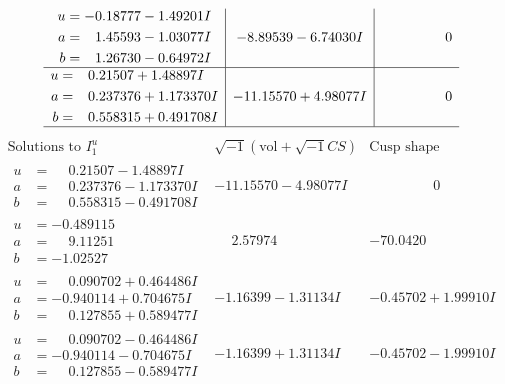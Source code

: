\documentclass[1p]{elsarticle_modified}
\theoremstyle{definition}
\newcommand{\I}{\sqrt{-1}}
\begin{document}
$$\begin{array}{c|c|c}
\begin{aligned}
u &= -0.18777 - 1.49201 I \\
a &= \phantom{-}1.45593 - 1.03077 I \\
b &= \phantom{-}1.26730 - 0.64972 I\end{aligned}
 & -8.89539 - 6.74030 I & \phantom{-0.000000 } 0 \\ \hline\begin{aligned}
u &= \phantom{-}0.21507 + 1.48897 I \\
a &= \phantom{-}0.237376 + 1.173370 I \\
b &= \phantom{-}0.558315 + 0.491708 I\end{aligned}
 & -11.15570 + 4.98077 I & \phantom{-0.000000 } 0\\
 \hline 
 \end{array}$$\newpage$$\begin{array}{c|c|c}  
\text{Solutions to }I^u_{1}& \I (\text{vol} + \sqrt{-1}CS) & \text{Cusp shape}\\
 \hline 
\begin{aligned}
u &= \phantom{-}0.21507 - 1.48897 I \\
a &= \phantom{-}0.237376 - 1.173370 I \\
b &= \phantom{-}0.558315 - 0.491708 I\end{aligned}
 & -11.15570 - 4.98077 I & \phantom{-0.000000 } 0 \\ \hline\begin{aligned}
u &= -0.489115\phantom{ +0.000000I} \\
a &= \phantom{-}9.11251\phantom{ +0.000000I} \\
b &= -1.02527\phantom{ +0.000000I}\end{aligned}
 & \phantom{-}2.57974\phantom{ +0.000000I} & -70.0420\phantom{ +0.000000I} \\ \hline\begin{aligned}
u &= \phantom{-}0.090702 + 0.464486 I \\
a &= -0.940114 + 0.704675 I \\
b &= \phantom{-}0.127855 + 0.589477 I\end{aligned}
 & -1.16399 - 1.31134 I & -0.45702 + 1.99910 I \\ \hline\begin{aligned}
u &= \phantom{-}0.090702 - 0.464486 I \\
a &= -0.940114 - 0.704675 I \\
b &= \phantom{-}0.127855 - 0.589477 I\end{aligned}
 & -1.16399 + 1.31134 I & -0.45702 - 1.99910 I \\ \hline\begin{aligned}

\end{aligned}
\end{array}$$
\end{document}
